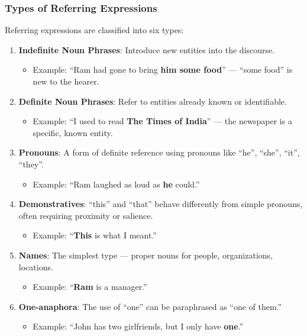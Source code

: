 \documentclass[11pt,a4paper]{article}
\begin{document}
\subsubsection{Types of Referring Expressions}

Referring expressions are classified into six types:

\begin{enumerate}
    \item \textbf{Indefinite Noun Phrases}: Introduce new entities into the discourse.
    \begin{itemize}
        \item Example: ``Ram had gone to bring \textbf{him some food}'' --- ``some food'' is new to the hearer.
    \end{itemize}
    
    \item \textbf{Definite Noun Phrases}: Refer to entities already known or identifiable.
    \begin{itemize}
        \item Example: ``I used to read \textbf{The Times of India}'' --- the newspaper is a specific, known entity.
    \end{itemize}
    
    \item \textbf{Pronouns}: A form of definite reference using pronouns like ``he'', ``she'', ``it'', ``they''.
    \begin{itemize}
        \item Example: ``Ram laughed as loud as \textbf{he} could.''
    \end{itemize}
    
    \item \textbf{Demonstratives}: ``this'' and ``that'' behave differently from simple pronouns, often requiring proximity or salience.
    \begin{itemize}
        \item Example: ``\textbf{This} is what I meant.''
    \end{itemize}
    
    \item \textbf{Names}: The simplest type --- proper nouns for people, organizations, locations.
    \begin{itemize}
        \item Example: ``\textbf{Ram} is a manager.''
    \end{itemize}
    
    \item \textbf{One-anaphora}: The use of ``one'' can be paraphrased as ``one of them.''
    \begin{itemize}
        \item Example: ``John has two girlfriends, but I only have \textbf{one}.''
    \end{itemize}
\end{enumerate}
\end{document}
